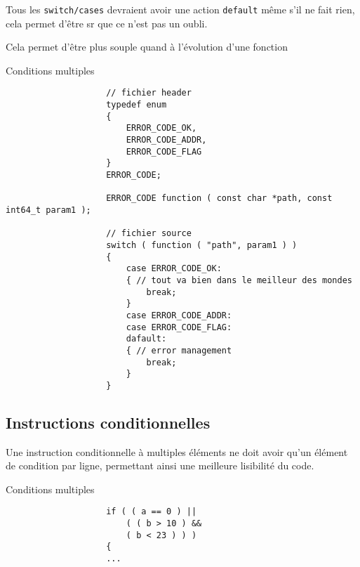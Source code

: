 			Tous les \verb+switch/cases+ devraient avoir une action \verb+default+ même s'il ne fait rien, cela permet d'être sr que ce n'est pas un oubli.

			Cela permet d’être plus souple quand à l'évolution d'une fonction

			\begin{cbox}{Conditions multiples}
				\begin{verbatim}
					// fichier header
					typedef enum
					{
					    ERROR_CODE_OK,
					    ERROR_CODE_ADDR,
					    ERROR_CODE_FLAG
					}
					ERROR_CODE;

					ERROR_CODE function ( const char *path, const int64_t param1 );

					// fichier source
					switch ( function ( "path", param1 ) )
					{
					    case ERROR_CODE_OK:
					    { // tout va bien dans le meilleur des mondes
					        break;
					    }
					    case ERROR_CODE_ADDR:
					    case ERROR_CODE_FLAG:
					    dafault:
					    { // error management
					        break;
					    }
					}
				\end{verbatim}
			\end{cbox}

		\subsection{Instructions conditionnelles}
			Une instruction conditionnelle à multiples éléments ne doit avoir qu'un élément de condition par ligne, permettant ainsi une meilleure lisibilité du code.

			\begin{cbox}{Conditions multiples}
				\begin{verbatim}
					if ( ( a == 0 ) ||
					    ( ( b > 10 ) &&
					    ( b < 23 ) ) )
					{
					...
				\end{verbatim}
			\end{cbox}

	
